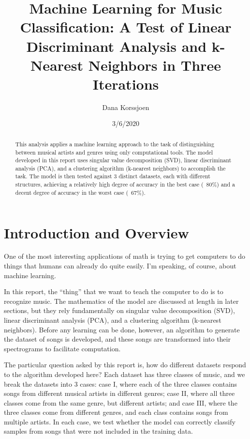 \documentclass[a4paper,10 pt]{article}
\title{Machine Learning for Music Classification: A Test of Linear Discriminant Analysis and k-Nearest Neighbors in Three Iterations}
\author{Dana Korssjoen}
\date{3/6/2020}
\begin{document}
\maketitle
\begin{abstract}
    This analysis applies a machine learning approach to the task of distinguishing between musical artists and genres using only computational tools. The model developed in this report uses singular value decomposition (SVD), linear discriminant analysis (PCA), and a clustering algorithm (k-nearest neighbors) to accomplish the task. The model is then tested against 3 distinct datasets, each with different structures, achieving a relatively high degree of accuracy in the best case (~80\%) and a decent degree of accuracy in the worst case (~67\%).
\end{abstract}
\section{Introduction and Overview}
One of the most interesting applications of math is trying to get computers to do things that humans can already do quite easily. I'm speaking, of course, about machine learning.

In this report, the ``thing'' that we want to teach the computer to do is to recognize music. The mathematics of the model are discussed at length in later sections, but they rely fundamentally on singular value decomposition (SVD), linear discriminant analysis (PCA), and a clustering algorithm (k-nearest neighbors). Before any learning can be done, however, an algorithm to generate the dataset of songs is developed, and these songs are transformed into their spectrograms to facilitate computation.

The particular question asked by this report is, how do different datasets respond to the algorithm developed here? Each dataset has three classes of music, and we break the datasets into 3 cases: case I, where each of the three classes contains songs from different musical artists in different genres; case II, where all three classes come from the same genre, but different artists; and case III, where the three classes come from different genres, and each class contains songs from multiple artists. In each case, we test whether the model can correctly classify samples from songs that were not included in the training data.
\end{document}
